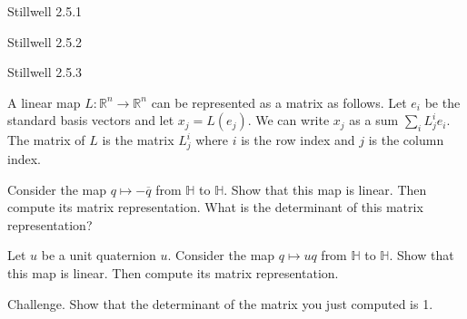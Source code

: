\documentclass[minion]{homework}
\newcommand{\Reals}{\mathbb{R}}
\def\Quats{\mathbb{H}}
\begin{document}
\begin{problems}
\problem Stillwell 2.5.1

\problem Stillwell 2.5.2

\problem Stillwell 2.5.3

\problem A linear map $L:\Reals^n\to\Reals^n$ can be represented
as a matrix as follows.  Let $e_i$ be the standard basis vectors
and let $x_j = L(e_j)$.  We can write $x_j$ as a sum $\sum_i L_j^i e_i$.
The matrix of $L$ is the matrix $L^i_j$ where $i$ is the row index and $j$
is the column index.  

\begin{subproblems}
\item Consider the map $q\mapsto -\overline{q}$ from $\Quats$ to $\Quats$.  
Show that this map is linear.  Then compute its matrix representation.
What is the determinant of this matrix representation?

\item Let $u$ be a unit quaternion $u$.  Consider the map $q\mapsto uq$
from $\Quats$ to $\Quats$.  Show that this map is linear.  Then compute its 
matrix representation.

\item Challenge. Show that the determinant of the matrix you just computed is 1.
\end{subproblems}

\end{problems}
\end{document}
